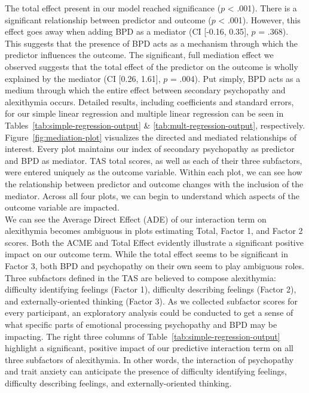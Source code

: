 \documentclass[
  man,floatsintext]{apa7}
\begin{document}
The total effect present in our model reached significance (\(p\) \textless{} .001). There is a significant relationship between predictor and outcome (\(p\) \textless{} .001). However, this effect goes away when adding BPD as a mediator (CI {[}-0.16, 0.35{]}, \(p\) = .368). This suggests that the presence of BPD acts as a mechanism through which the predictor influences the outcome. The significant, full mediation effect we observed suggests that the total effect of the predictor on the outcome is wholly explained by the mediator (CI {[}0.26, 1.61{]}, \(p\) = .004). Put simply, BPD acts as a medium through which the entire effect between secondary psychopathy and alexithymia occurs. Detailed results, including coefficients and standard errors, for our simple linear regression and multiple linear regression can be seen in Tables~\ref{tab:simple-regression-output} \& \ref{tab:mult-regression-output}, respectively.\\
Figure~\ref{fig:mediation-plot} visualizes the directed and mediated relationships of interest. Every plot maintains our index of secondary psychopathy as predictor and BPD as mediator. TAS total scores, as well as each of their three subfactors, were entered uniquely as the outcome variable. Within each plot, we can see how the relationship between predictor and outcome changes with the inclusion of the mediator. Across all four plots, we can begin to understand which aspects of the outcome variable are impacted.\\
We can see the Average Direct Effect (ADE) of our interaction term on alexithymia becomes ambiguous in plots estimating Total, Factor 1, and Factor 2 scores. Both the ACME and Total Effect evidently illustrate a significant positive impact on our outcome term. While the total effect seems to be significant in Factor 3, both BPD and psychopathy on their own seem to play ambiguous roles.\\
Three subfactors defined in the TAS are believed to compose alexithymia: difficulty identifying feelings (Factor 1), difficulty describing feelings (Factor 2), and externally-oriented thinking (Factor 3). As we collected subfactor scores for every participant, an exploratory analysis could be conducted to get a sense of what specific parts of emotional processing psychopathy and BPD may be impacting. The right three columns of Table~\ref{tab:simple-regression-output} highlight a significant, positive impact of our predictive interaction term on all three subfactors of alexithymia. In other words, the interaction of psychopathy and trait anxiety can anticipate the presence of difficulty identifying feelings, difficulty describing feelings, and externally-oriented thinking.\\
\end{document}
